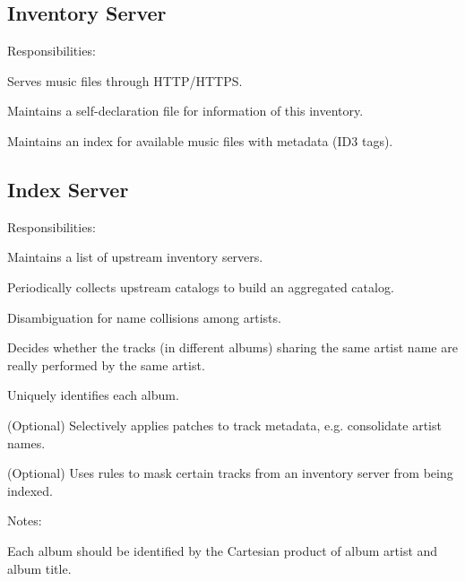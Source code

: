 \documentclass[a4paper,11pt]{article}
\begin{document}
\subsection{Inventory Server}

Responsibilities:

\begin{compactitem}
	\item Serves music files through HTTP/HTTPS.
	\item Maintains a self-declaration file for information of this inventory.
	\item Maintains an index for available music files with metadata (ID3 tags).
\end{compactitem}





\subsection{Index Server}


Responsibilities:

\begin{compactitem}
	\item Maintains a list of upstream inventory servers.
	\item Periodically collects upstream catalogs to build an aggregated catalog.
	\item Disambiguation for name collisions among artists.
	\item Decides whether the tracks (in different albums) sharing the same artist name are really performed by the same artist.
	\item Uniquely identifies each album.
	\item (Optional) Selectively applies patches to track metadata, e.g. consolidate artist names.
	\item (Optional) Uses rules to mask certain tracks from an inventory server from being indexed.
\end{compactitem}

Notes:

\begin{compactitem}
	\item Each album should be identified by the Cartesian product of album artist and album title.
\end{compactitem}
\end{document}
